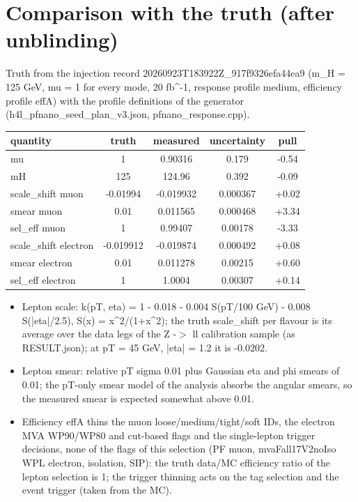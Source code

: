 \documentclass[11pt,a4paper]{article}
\begin{document}
\section{Comparison with the truth (after unblinding)}
Truth from the injection record 20260923T183922Z\_917f9326efa44ea9 (m\_H = 125 GeV, mu = 1 for every mode, 20 fb\^{}-1, response profile medium, efficiency profile effA) with the profile definitions of the generator (h4l\_pfnano\_seed\_plan\_v3.json, pfnano\_response.cpp).

\begin{table}[H]\centering\small\begin{tabular}{lcccc}\toprule quantity & truth & measured & uncertainty & pull\\\midrule
mu & 1 & 0.90316 & 0.179 & -0.54\\
mH & 125 & 124.96 & 0.392 & -0.09\\
scale\_shift muon & -0.01994 & -0.019932 & 0.000367 & +0.02\\
smear muon & 0.01 & 0.011565 & 0.000468 & +3.34\\
sel\_eff muon & 1 & 0.99407 & 0.00178 & -3.33\\
scale\_shift electron & -0.019912 & -0.019874 & 0.000492 & +0.08\\
smear electron & 0.01 & 0.011278 & 0.00215 & +0.60\\
sel\_eff electron & 1 & 1.0004 & 0.00307 & +0.14\\
\bottomrule\end{tabular}\end{table}
\begin{itemize}
\item Lepton scale: k(pT, eta) = 1 - 0.018 - 0.004 S(pT/100 GeV) - 0.008 S(|eta|/2.5), S(x) = x\^{}2/(1+x\^{}2); the truth scale\_shift per flavour is its average over the data legs of the Z -$>$ ll calibration sample (as RESULT.json); at pT = 45 GeV, |eta| = 1.2 it is -0.0202.
\item Lepton smear: relative pT sigma 0.01 plus Gaussian eta and phi smears of 0.01; the pT-only smear model of the analysis absorbs the angular smears, so the measured smear is expected somewhat above 0.01.
\item Efficiency effA thins the muon loose/medium/tight/soft IDs, the electron MVA WP90/WP80 and cut-based flags and the single-lepton trigger decisions, none of the flags of this selection (PF muon, mvaFall17V2noIso WPL electron, isolation, SIP): the truth data/MC efficiency ratio of the lepton selection is 1; the trigger thinning acts on the tag selection and the event trigger (taken from the MC).
\end{itemize}
\appendix
\end{document}
